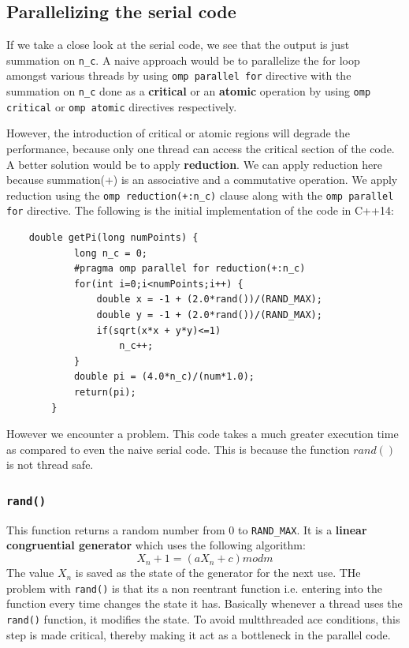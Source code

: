 \documentclass[12,a4paper]{article}
\def\code#1{\texttt{#1}}
\begin{document}
{    \subsection{Parallelizing the serial code}
    If we take a close look at the serial code, we see that the output is just summation on \code{n\_c}. A naive approach would be to parallelize the for loop amongst various threads by using \code{omp parallel for} directive with the summation on \code{n\_c} done as a \textbf{critical} or an \textbf{atomic} operation by using \code{omp critical} or \code{omp atomic} directives respectively.
    
    However, the introduction of critical or atomic regions will degrade the performance, because only one thread can access the critical section of the code. A better solution would be to apply \textbf{reduction}. We can apply reduction here because summation(+) is an associative  and a commutative operation. We apply reduction using the \code{omp reduction(+:n\_c)} clause along with the \code{omp parallel for} directive. The following is the initial implementation of the code in C++14:
    \begin{lstlisting}
    double getPi(long numPoints) {
            long n_c = 0;
            #pragma omp parallel for reduction(+:n_c)
            for(int i=0;i<numPoints;i++) {
                double x = -1 + (2.0*rand())/(RAND_MAX);
                double y = -1 + (2.0*rand())/(RAND_MAX);
                if(sqrt(x*x + y*y)<=1)
                    n_c++;
            }
            double pi = (4.0*n_c)/(num*1.0);
            return(pi);
        }
    \end{lstlisting}
    However we encounter a problem. This code takes a much greater execution time as compared to even the naive serial code. This is because the function $rand()$ is not thread safe.
    \subsubsection{\code{rand()}}
    This function returns a random number from 0 to \code{RAND\_MAX}. It is a \textbf{linear congruential generator} which uses the following algorithm:
    \begin{equation}
        X_n+1 = (aX_n+c) mod m
    \end{equation}
    The value $X_n$ is saved as the state of the generator for the next use. THe problem with \code{rand()} is that its a non reentrant function i.e. entering into the function every time changes the state it has. Basically whenever a thread uses the \code{rand()} function, it modifies the state. To avoid multthreaded ace conditions, this step is made critical, thereby making it act as a bottleneck in the parallel code.
}
\end{document}
